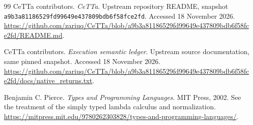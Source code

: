 \documentclass[11pt,a4paper]{article}
\begin{document}
\begin{thebibliography}{99}
CeTTa contributors.
\emph{CeTTa}.
Upstream repository README, snapshot
\texttt{a9b3a81186529fd99649e437809bdb6f58fce2fd}.
Accessed 18 November 2026.
\url{https://github.com/zariuq/CeTTa/blob/a9b3a81186529fd99649e437809bdb6f58fce2fd/README.md}.

CeTTa contributors.
\emph{Execution semantic ledger}.
Upstream source documentation, same pinned snapshot. Accessed
18 November 2026.
\url{https://github.com/zariuq/CeTTa/blob/a9b3a81186529fd99649e437809bdb6f58fce2fd/docs/native_returns.txt}.

Benjamin C. Pierce.
\emph{Types and Programming Languages}.
MIT Press, 2002. See the treatment of the simply typed lambda calculus
and normalization.
\url{https://mitpress.mit.edu/9780262303828/types-and-programming-languages/}.
\end{thebibliography}
\endgroup
\end{document}
